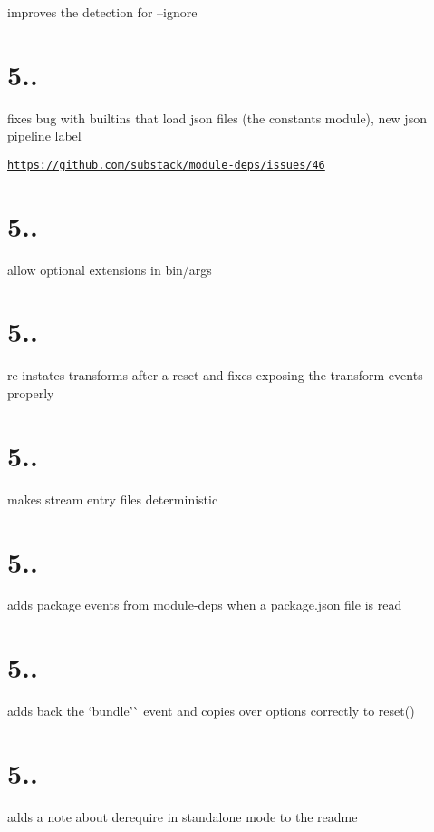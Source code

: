 improves the detection for --ignore

\section*{5..}

fixes bug with builtins that load json files (the \textquotesingle{}constants\textquotesingle{} module), new \textquotesingle{}json\textquotesingle{} pipeline label

\href{https://github.com/substack/module-deps/issues/46}{\tt https\+://github.\+com/substack/module-\/deps/issues/46}

\section*{5..}

allow optional extensions in bin/args

\section*{5..}

re-\/instates transforms after a reset and fixes exposing the transform events properly

\section*{5..}

makes stream entry files deterministic

\section*{5..}

adds \textquotesingle{}package\textquotesingle{} events from module-\/deps when a package.\+json file is read

\section*{5..}

adds back the `\textquotesingle{}bundle'\`{} event and copies over options correctly to reset()

\section*{5..}

adds a note about derequire in standalone mode to the readme


